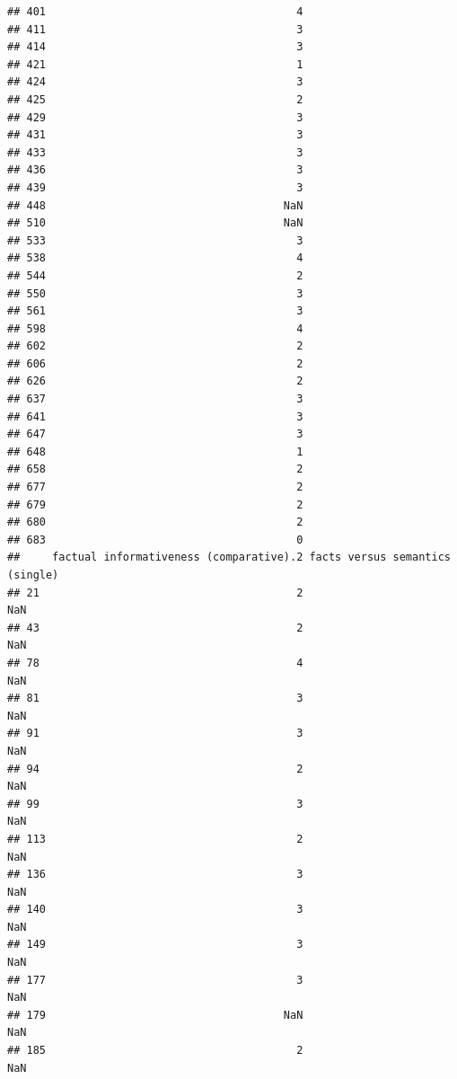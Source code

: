 \documentclass[
]{article}
\begin{document}
\begin{verbatim}
## 401                                       4
## 411                                       3
## 414                                       3
## 421                                       1
## 424                                       3
## 425                                       2
## 429                                       3
## 431                                       3
## 433                                       3
## 436                                       3
## 439                                       3
## 448                                     NaN
## 510                                     NaN
## 533                                       3
## 538                                       4
## 544                                       2
## 550                                       3
## 561                                       3
## 598                                       4
## 602                                       2
## 606                                       2
## 626                                       2
## 637                                       3
## 641                                       3
## 647                                       3
## 648                                       1
## 658                                       2
## 677                                       2
## 679                                       2
## 680                                       2
## 683                                       0
##     factual informativeness (comparative).2 facts versus semantics (single)
## 21                                        2                             NaN
## 43                                        2                             NaN
## 78                                        4                             NaN
## 81                                        3                             NaN
## 91                                        3                             NaN
## 94                                        2                             NaN
## 99                                        3                             NaN
## 113                                       2                             NaN
## 136                                       3                             NaN
## 140                                       3                             NaN
## 149                                       3                             NaN
## 177                                       3                             NaN
## 179                                     NaN                             NaN
## 185                                       2                             NaN

\end{verbatim}
\end{document}
